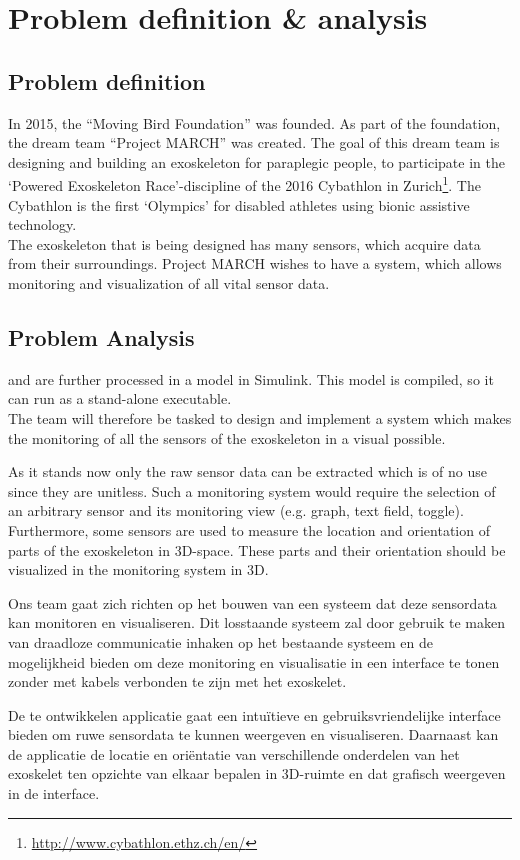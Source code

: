 \section{Problem definition \& analysis}
\subsection{Problem definition}
In 2015, the ``Moving Bird Foundation'' was founded. As part of the foundation, the dream team ``Project MARCH'' was created. The goal of this dream team is designing and building an exoskeleton for paraplegic people, to participate in the `Powered Exoskeleton Race'-discipline of the 2016 Cybathlon in Zurich\footnote{\url{http://www.cybathlon.ethz.ch/en/}}. The Cybathlon is the first `Olympics' for disabled athletes using bionic assistive technology.\\ 
The exoskeleton that is being designed has many sensors, which acquire data from their surroundings. Project MARCH wishes to have a system, which allows monitoring and visualization of all vital sensor data.

\subsection{Problem Analysis}

and are further processed in a model in Simulink. This model is compiled, so it can run as a stand-alone executable.\\
The team will therefore be tasked to design and implement a system which makes the monitoring of all the sensors of the exoskeleton in a visual possible.

As it stands now only the raw sensor data can be extracted which is of no use since they are unitless. Such a monitoring system would require the selection of an arbitrary sensor and its monitoring view (e.g. graph, text field, toggle). Furthermore, some sensors are used to measure the location and orientation of parts of the exoskeleton in 3D-space. These parts and their orientation should be visualized in the monitoring system in 3D.



Ons team gaat zich richten op het bouwen van een systeem dat deze sensordata kan monitoren en visualiseren. Dit losstaande systeem zal door gebruik te maken van draadloze communicatie inhaken op het bestaande systeem en de mogelijkheid bieden om deze monitoring en visualisatie in een interface te tonen zonder met kabels verbonden te zijn met het exoskelet.

De te ontwikkelen applicatie gaat een intuïtieve en gebruiksvriendelijke interface bieden om ruwe sensordata te kunnen weergeven en visualiseren. Daarnaast kan de applicatie de locatie en oriëntatie van verschillende onderdelen van het exoskelet ten opzichte van elkaar bepalen in 3D-ruimte en dat grafisch weergeven in de interface.
